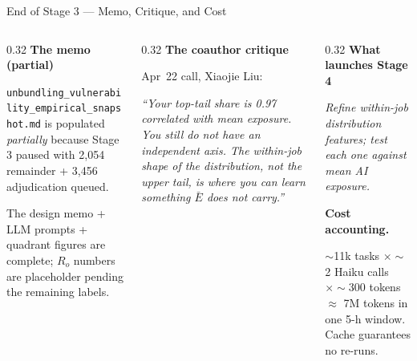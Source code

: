 \documentclass[10pt,english,aspectratio=169]{beamer}
\begin{document}
\begin{frame}{End of Stage 3 --- Memo, Critique, and Cost}
\begin{columns}[T]
\begin{column}{0.32\textwidth}
\textbf{The memo (partial)}
\begin{tcolorbox}[colback=gray!5,colframe=gray!40]\scriptsize
\texttt{unbundling\_vulnerability\_empirical\_snapshot.md} is populated \emph{partially} because Stage 3 paused with 2{,}054 remainder + 3{,}456 adjudication queued.

\vspace{0.1cm}
The design memo + LLM prompts + quadrant figures are complete; $R_o$ numbers are placeholder pending the remaining labels.
\end{tcolorbox}
\end{column}
\begin{column}{0.32\textwidth}
\textbf{The coauthor critique}
\begin{tcolorbox}[colback=gray!5,colframe=RedTitle!60]\scriptsize
Apr~22 call, Xiaojie Liu:

\vspace{0.1cm}
\emph{``Your top-tail share is 0.97 correlated with mean exposure. You still do not have an independent axis. The within-job \emph{shape of the distribution}, not the upper tail, is where you can learn something $\bar E$ does not carry.''}
\end{tcolorbox}
\end{column}
\begin{column}{0.32\textwidth}
\textbf{What launches Stage 4}
\begin{tcolorbox}[colback=blue!3,colframe=RedTitle!60]\small
\emph{Refine within-job distribution features; test each one against mean AI exposure.}
\end{tcolorbox}

\vspace{0.15cm}
\textbf{Cost accounting.}
\begin{tcolorbox}[colback=gray!5,colframe=gray!40]\scriptsize
$\sim$11k tasks $\times \sim$2 Haiku calls $\times \sim$300 tokens $\approx$ 7M tokens in one 5-h window. Cache guarantees no re-runs.
\end{tcolorbox}
\end{column}
\end{columns}
\end{frame}
\end{document}
